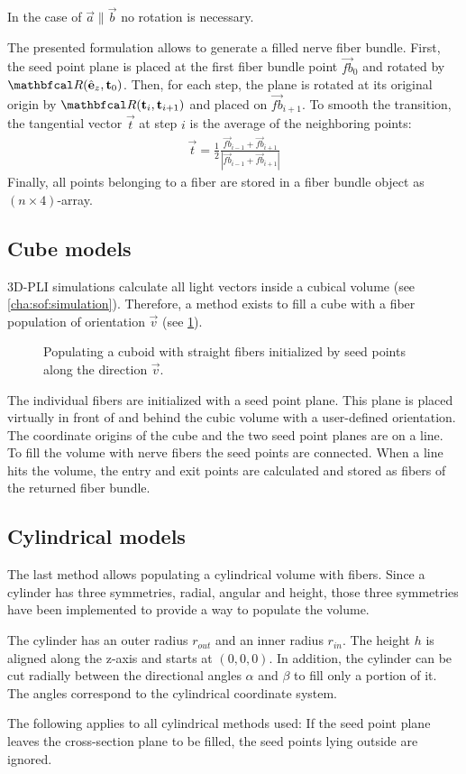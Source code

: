% 
In the case of $\vec{a} \parallel \vec{b}$ no rotation is necessary.
\par
% 
The presented formulation allows to generate a filled nerve fiber bundle.
First, the seed point plane is placed at the first fiber bundle point $\vec{fb}_0$ and rotated by $\mat{R}(\hat{\vec{e}}_z, \vec{t}_0)$.
Then, for each step, the plane is rotated at its original origin by $\mat{R}(\vec{t}_i, \vec{t}_{i+1})$ and placed on $\vec{fb}_{i+1}$.
To smooth the transition, the tangential vector $\vec{t}$ at step $i$ is the average of the neighboring points:
\begin{align}
    \vec{t} = \frac{1}{2} \frac{\vec{fb}_{i-1} + \vec{fb}_{i+1}}{|\vec{fb}_{i-1} + \vec{fb}_{i+1}|}
\end{align}
%
Finally, all points belonging to a fiber are stored in a fiber bundle object as $(n \times 4)$-array.
%
%
%
\subsection{Cube models} \label{sec:cubeModelBuilding}
%
\ac{3D-PLI} simulations calculate all light vectors inside a cubical volume (see \cref{cha:sof:simulation}).
Therefore, a method exists to fill a cube with a fiber population of orientation $\vec{v}$ (see \cref{fig:cubeBuild}).
%
\begin{figure}[!t]
    \centering
    \setlength{\tikzwidth}{0.5\textwidth}
	\caption{Populating a cuboid with straight fibers initialized by seed points along the direction $\vec{v}$.}
    \label{fig:cubeBuild}%
\end{figure}
% 
The individual fibers are initialized with a seed point plane.
This plane is placed virtually in front of and behind the cubic volume with a user-defined orientation.
The coordinate origins of the cube and the two seed point planes are on a line.
To fill the volume with nerve fibers the seed points are connected.
When a line hits the volume, the entry and exit points are calculated and stored as fibers of the returned fiber bundle.
%
%
%
\subsection{Cylindrical models}
%
The last method allows populating a cylindrical volume with fibers.
Since a cylinder has three symmetries, radial, angular and height, those three symmetries have been implemented to provide a way to populate the volume.
\par
%
The cylinder has an outer radius $r_{\mathit{out}}$ and an inner radius $r_{\mathit{in}}$.
The height $h$ is aligned along the z-axis and starts at $(0,0,0)$.
In addition, the cylinder can be cut radially between the directional angles $\alpha$ and $\beta$ to fill only a portion of it.
The angles correspond to the cylindrical coordinate system.
\par
%
The following applies to all cylindrical methods used: If the seed point plane leaves the cross-section plane to be filled, the seed points lying outside are ignored.
%
